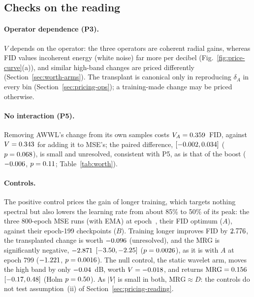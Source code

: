 \subsection{Checks on the reading}
\label{sec:worth-checks}

\paragraph{Operator dependence (P3).}
$V$ depends on the operator: the three operators are coherent radial gains,
whereas FID values incoherent energy (white noise) far more per decibel
(Fig.~\ref{fig:price-curve}(a)), and similar high-band changes are priced
differently (Section~\ref{sec:worth-arms}). The transplant is
canonical only in reproducing $\delta_A$ in every bin
(Section~\ref{sec:pricing-ops}); a training-made change may be priced
otherwise.

\paragraph{No interaction (P5).}
Removing AWWL's change from its own samples costs
$V_A = 0.359$~FID, against $V = 0.343$ for adding
it to MSE's; the paired difference, \interactionTransplant{}
$[-0.002, 0.034]$
($p = 0.068$), is small and unresolved, consistent with P5,
as is that of the boost ($-0.006$,
$p = 0.11$; Table~\ref{tab:worth}).

\paragraph{Controls.}
The positive control prices the gain of longer training, which targets
nothing spectral but also lowers the learning rate from about 85\% to 50\% of
its peak: the three 800-epoch MSE runs (with EMA)
at epoch~\longBestEpochMSE{}, their FID optimum ($A$), against their
epoch-199 checkpoints ($B$). Training longer improves FID by
$2.776$, the transplanted change is worth $-0.096$
(unresolved), and the MRG is significantly negative,
$-2.871$ $[-3.50, -2.25]$ ($p = 0.0026$), as it is
with $A$ at epoch 799 ($-1.221$, $p = 0.0016$). The
null control, the static wavelet arm, moves the high band by only
$-0.04$~dB, worth $V = -0.018$, and returns
$\mathrm{MRG} = 0.156$ $[-0.17, 0.48]$ (Holm
$p = 0.50$). As $|V|$ is small in both, $\mathrm{MRG} \approx
D$: the controls do not test assumption~(ii) of
Section~\ref{sec:pricing-reading}.

